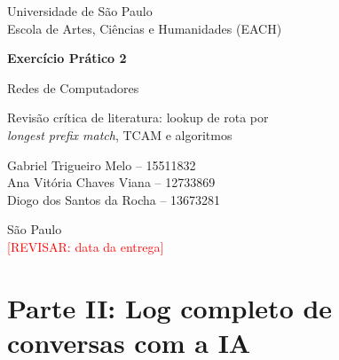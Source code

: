 \documentclass[11pt,a4paper]{article}
\newcommand{\revisar}[1]{\textcolor{red}{[REVISAR: #1]}}
\begin{document}
\begin{titlepage}
\centering
Universidade de São Paulo\\
Escola de Artes, Ciências e Humanidades (EACH)
\vspace*{\fill}

{\LARGE\bfseries Exercício Prático 2\par}
\vspace{0.6em}
{\large Redes de Computadores\par}
\vspace{0.6em}
{\large Revisão crítica de literatura: lookup de rota por\\ \textit{longest prefix match}, TCAM e algoritmos\par}
\vspace*{\fill}

Gabriel Trigueiro Melo -- 15511832\\
Ana Vitória Chaves Viana -- 12733869\\
Diogo dos Santos da Rocha -- 13673281
\vspace*{\fill}

São Paulo\\
\revisar{data da entrega}
\end{titlepage}



\clearpage
\part*{Parte II: Log completo de conversas com a IA}
\end{document}
